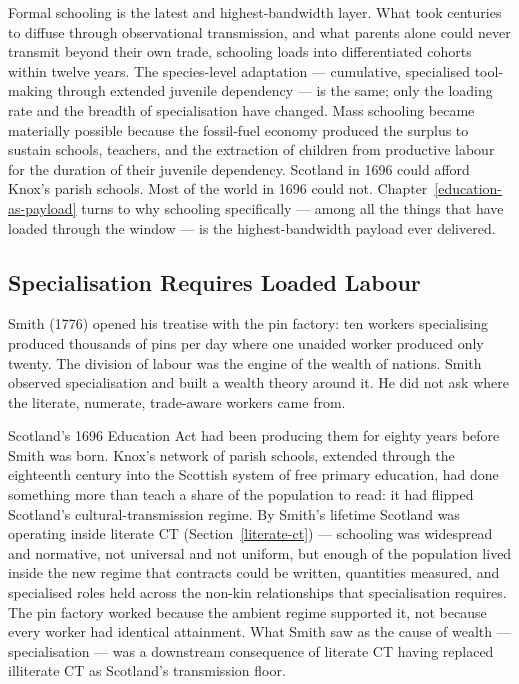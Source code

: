 \documentclass[12pt,letterpaper]{article}
\begin{document}
Formal schooling is the latest and highest-bandwidth layer. What took
centuries to diffuse through observational transmission, and what
parents alone could never transmit beyond their own trade, schooling
loads into differentiated cohorts within twelve years. The
species-level adaptation --- cumulative, specialised tool-making
through extended juvenile dependency --- is the same; only the
loading rate and the breadth of specialisation have changed. Mass
schooling became materially possible because the fossil-fuel economy
produced the surplus to sustain schools, teachers, and the extraction
of children from productive labour for the duration of their
juvenile dependency. Scotland in 1696 could afford Knox's parish
schools. Most of the world in 1696 could not. Chapter~\ref{education-as-payload}
turns to why schooling specifically --- among all the things that
have loaded through the window --- is the highest-bandwidth payload
ever delivered.

\subsection{Specialisation Requires Loaded Labour}\label{specialisation-requires-loaded-labour}

Smith (1776) opened his treatise with the pin factory: ten workers
specialising produced thousands of pins per day where one unaided
worker produced only twenty. The division of labour was the engine of
the wealth of nations. Smith observed specialisation and built a
wealth theory around it. He did not ask where the literate, numerate,
trade-aware workers came from.

Scotland's 1696 Education Act had been producing them for eighty
years before Smith was born. Knox's network of parish schools,
extended through the eighteenth century into the Scottish system of
free primary education, had done something more than teach a share of
the population to read: it had flipped Scotland's cultural-transmission
regime. By Smith's lifetime Scotland was operating inside literate CT
(Section~\ref{literate-ct}) --- schooling was widespread and
normative, not universal and not uniform, but enough of the population
lived inside the new regime that contracts could be written,
quantities measured, and specialised roles held across the non-kin
relationships that specialisation requires. The pin factory worked
because the ambient regime supported it, not because every worker had
identical attainment. What Smith saw as the cause of wealth ---
specialisation --- was a downstream consequence of literate CT having
replaced illiterate CT as Scotland's transmission floor.
\end{document}
